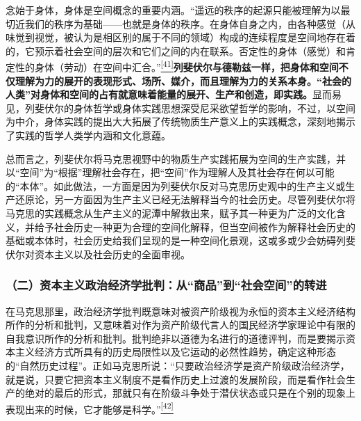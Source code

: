 \documentclass[UTF8, fontset = sourcesans, a4paper, oneside, zihao =
-4, scheme=chinese, no-math, space=true]{ctexbook}
\begin{document}
念始于身体，身体是空间概念的重要内涵。``遥远的秩序的起源只能被理解为以最切近我们的秩序为基础------也就是身体的秩序。在身体自身之内，由各种感觉（从味觉到视觉，被认为是相区别的属于不同的领域）构成的连续程度是空间地存在着的，它预示着社会空间的层次和它们之间的内在联系。否定性的身体（感觉）和肯定性的身体（劳动）在空间中汇合。''\protect\hypertarget{part0010_split_002.htmlux5cux23w41}{}{}\protect\hyperlink{part0010_split_002.htmlux5cux23m41}{\textsuperscript{{[}41{]}}}\textbf{列斐伏尔与德勒兹一样，把身体和空间不仅理解为力的展开的表现形式、场所、媒介，而且理解为力的关系本身。``社会的人类''对身体和空间的占有就意味着能量的展开、生产和创造，即实践。}显而易见，列斐伏尔的身体哲学或身体实践思想深受尼采欲望哲学的影响，不过，以空间为中介，身体实践的提出大大拓展了传统物质生产意义上的实践概念，深刻地揭示了实践的哲学人类学内涵和文化意蕴。

总而言之，列斐伏尔将马克思视野中的物质生产实践拓展为空间的生产实践，并以``空间''为``根据''理解社会存在，把``空间''作为理解人及其社会存在何以可能的``本体''。如此做法，一方面是因为列斐伏尔反对马克思历史观中的生产主义或生产还原论，另一方面因为生产主义已经无法解释当今的社会历史。尽管列斐伏尔将马克思的实践概念从生产主义的泥潭中解救出来，赋予其一种更为广泛的文化含义，并给予社会历史一种更为合理的空间化解释，但当空间被作为解释社会历史的基础或本体时，社会历史给我们呈现的是一种空间化景观，这或多或少会妨碍列斐伏尔对资本主义以及社会历史的全面审视。

\subsubsection{\texorpdfstring{（二）资本主义政治经济学批判：从``商品''到``社会空间''的转进}{（二）资本主义政治经济学批判：从商品到社会空间的转进}}\label{part0010_split_002.htmlux5cux23d040}

在马克思那里，政治经济学批判既意味对被资产阶级视为永恒的资本主义经济结构所作的分析和批判，又意味着对作为资产阶级代言人的国民经济学家理论中有限的自我意识所作的分析和批判。批判绝非以道德为名进行的道德评判，而是要揭示资本主义经济方式所具有的历史局限性以及它运动的必然性趋势，确定这种形态的``自然历史过程''。正如马克思所说：``只要政治经济学是资产阶级政治经济学，就是说，只要它把资本主义制度不是看作历史上过渡的发展阶段，而是看作社会生产的绝对的最后的形式，那就只有在阶级斗争处于潜伏状态或只是在个别的现象上表现出来的时候，它才能够是科学。''\protect\hypertarget{part0010_split_002.htmlux5cux23w42}{}{}\protect\hyperlink{part0010_split_002.htmlux5cux23m42}{\textsuperscript{{[}42{]}}}
\end{document}
